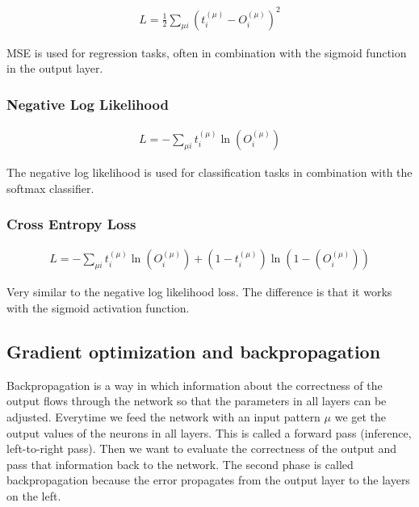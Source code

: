 \begin{gather}
	L =  \frac{1}{2} \sum\limits_{\mu i} \left( t_{i}^{(\mu)} - O_{i}^{(\mu)} \right)^2
\end{gather}

MSE is used for regression tasks, often in combination with the sigmoid function in the output layer. \cite{groman}

\subsubsection{Negative Log Likelihood} 

\begin{gather}
	L = - \sum\limits_{\mu i}  t_{i}^{(\mu)} \ln (O_{i}^{(\mu)})
\end{gather}

The negative log likelihood is used for classification tasks in combination with the softmax classifier. \cite{mehlig}

\subsubsection{Cross Entropy Loss} 

\begin{gather}
	L = - \sum\limits_{\mu i}  t_{i}^{(\mu)} \ln (O_{i}^{(\mu)}) + (1 - t_{i}^{(\mu)}) \ln (1 - (O_{i}^{(\mu)}))
\end{gather}

Very similar to the negative log likelihood loss. The difference is that it works with the sigmoid activation function. \cite{mehlig}

\newpage
\subsection{Gradient optimization and backpropagation}

Backpropagation is a way in which information about the correctness of the output flows through the network so that the parameters in all layers can be adjusted. Everytime we feed the network with an input pattern $ \mu $ we get the output values of the neurons in all layers. This is called a forward pass (inference, left-to-right pass). Then we want to evaluate the correctness of the output and pass that information back to the network. The second phase is called backpropagation because the error propagates from the output layer to the layers on the left. \cite{mehlig}

